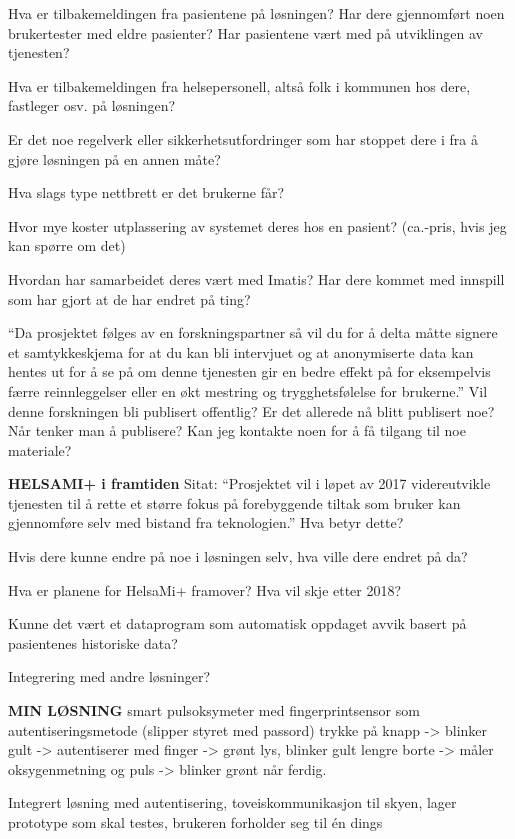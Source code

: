 Hva er tilbakemeldingen fra pasientene på løsningen? Har dere gjennomført noen brukertester med eldre pasienter? Har pasientene vært med på utviklingen av tjenesten?
 
Hva er tilbakemeldingen fra helsepersonell, altså folk i kommunen hos dere, fastleger osv. på løsningen?
 
Er det noe regelverk eller sikkerhetsutfordringer som har stoppet dere i fra å gjøre løsningen på en annen måte?
 
Hva slags type nettbrett er det brukerne får?
 
Hvor mye koster utplassering av systemet deres hos en pasient? (ca.-pris, hvis jeg kan spørre om det)
 
Hvordan har samarbeidet deres vært med Imatis? 
Har dere kommet med innspill som har gjort at de har endret på ting? 
 
“Da prosjektet følges av en forskningspartner så vil du for å delta måtte signere et samtykkeskjema for at du kan bli intervjuet og at anonymiserte data kan hentes ut for å se på om denne tjenesten gir en bedre effekt på for eksempelvis færre reinnleggelser eller en økt mestring og trygghetsfølelse for brukerne.”
Vil denne forskningen bli publisert offentlig? Er det allerede nå blitt publisert noe? Når tenker man å publisere? Kan jeg kontakte noen for å få tilgang til noe materiale? 
 
\textbf{HELSAMI+ i framtiden}
Sitat: “Prosjektet vil i løpet av 2017 videreutvikle tjenesten til å rette et større fokus på forebyggende tiltak som bruker kan gjennomføre selv med bistand fra teknologien.”
Hva betyr dette?
 
Hvis dere kunne endre på noe i løsningen selv, hva ville dere endret på da?
 
Hva er planene for HelsaMi+ framover? Hva vil skje etter 2018?
 
Kunne det vært et dataprogram som automatisk oppdaget avvik basert på pasientenes historiske data? 
 
Integrering med andre løsninger? 
 
\textbf{MIN LØSNING}
smart pulsoksymeter med fingerprintsensor som autentiseringsmetode (slipper styret med passord)
trykke på knapp -> blinker gult -> autentiserer med finger -> grønt lys, blinker gult lengre borte -> måler oksygenmetning og puls -> blinker grønt når ferdig.
 
Integrert løsning med autentisering, toveiskommunikasjon til skyen, lager prototype som skal testes, brukeren forholder seg til én dings
 
